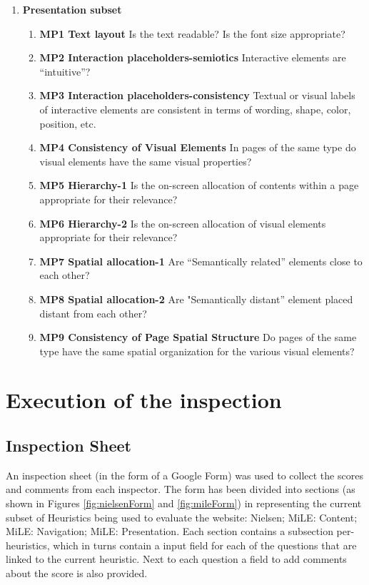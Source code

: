 \begin{enumerate}
	\item \textbf{Presentation subset}
		\begin{enumerate}
			\item \textbf{MP1 Text layout} Is the text readable? Is the font size appropriate?
			\item \textbf{MP2 Interaction placeholders-semiotics} Interactive elements are “intuitive”?
			\item \textbf{MP3 Interaction placeholders-consistency} Textual or visual labels of interactive elements are consistent in terms of wording, shape, color, position, etc.
			\item \textbf{MP4 Consistency of Visual Elements} In pages of the same type do visual elements have the same visual properties?
			\item \textbf{MP5 Hierarchy-1} Is the on-screen allocation of contents within a page appropriate for their relevance?
			\item \textbf{MP6 Hierarchy-2} Is the on-screen allocation of visual elements appropriate for their relevance?
			\item \textbf{MP7 Spatial allocation-1} Are “Semantically related” elements close to each other?
			\item \textbf{MP8 Spatial allocation-2} Are "Semantically distant” element placed distant from each other?
			\item \textbf{MP9 Consistency of Page Spatial Structure} Do pages of the same type have the same spatial organization for the various visual elements?
		\end{enumerate}
\end{enumerate}

\section{Execution of the inspection}
\subsection{Inspection Sheet}
An inspection sheet (in the form of a Google Form) was used to collect the scores and comments from each inspector. The form has been divided into sections (as shown in Figures \ref{fig:nielsenForm} and \ref{fig:mileForm}) in representing the current subset of Heuristics being used to evaluate the website: Nielsen; MiLE: Content; MiLE: Navigation; MiLE: Presentation. Each section contains a subsection per-heuristics, which in turns contain a input field for each of the questions that are linked to the current heuristic. Next to each question a field to add comments about the score is also provided.


